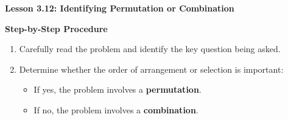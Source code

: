 \begin{center}
\textbf{Lesson 3.12: Identifying Permutation or Combination}
\end{center}

\vspace*{-1.5ex}


\noindent\textbf{Step-by-Step Procedure}

\begin{enumerate}
    \item Carefully read the problem and identify the key question being asked.
    \item Determine whether the order of arrangement or selection is important:
    \begin{itemize}
        \item If yes, the problem involves a \textbf{permutation}.
        \item If no, the problem involves a \textbf{combination}.
    \end{itemize}
\end{enumerate}
